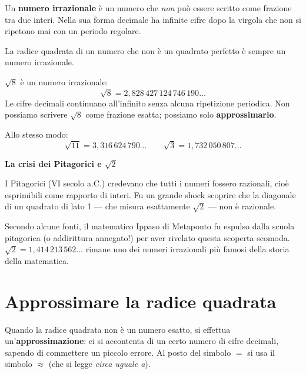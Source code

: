 \begin{definizione}
    Un \textbf{numero irrazionale} è un numero che \emph{non} può essere
    scritto come frazione tra due interi. Nella sua forma decimale ha
    infinite cifre dopo la virgola che non si ripetono mai con un periodo
    regolare.

    La radice quadrata di un numero che non è un quadrato perfetto è sempre
    un numero irrazionale.
\end{definizione}

\begin{esempio}
    \(\sqrt{8}\) è un numero irrazionale:
    \[
        \sqrt{8} = 2{,}828\,427\,124\,746\,190\ldots
    \]
    Le cifre decimali continuano all'infinito senza alcuna ripetizione periodica.
    Non possiamo scrivere \(\sqrt{8}\) come frazione esatta; possiamo solo
    \textbf{approssimarlo}.

    Allo stesso modo:
    \[
        \sqrt{11} = 3{,}316\,624\,790\ldots \qquad
        \sqrt{3}  = 1{,}732\,050\,807\ldots
    \]
\end{esempio}

\begin{sapevi}
    \textbf{La crisi dei Pitagorici e \(\sqrt{2}\)}

    I Pitagorici (VI secolo a.C.) credevano che tutti i numeri fossero
    razionali, cioè esprimibili come rapporto di interi. Fu un grande
    shock scoprire che la diagonale di un quadrato di lato 1 — che misura
    esattamente \(\sqrt{2}\) — non è razionale.

    Secondo alcune fonti, il matematico Ippaso di Metaponto fu espulso
    dalla scuola pitagorica (o addirittura annegato!) per aver rivelato
    questa scoperta scomoda. \(\sqrt{2} = 1{,}414\,213\,562\ldots\) rimane
    uno dei numeri irrazionali più famosi della storia della matematica.
\end{sapevi}

\section{Approssimare la radice quadrata}

Quando la radice quadrata non è un numero esatto, si effettua
un'\textbf{approssimazione}: ci si accontenta di un certo numero di
cifre decimali, sapendo di commettere un piccolo errore.
Al posto del simbolo \(=\) si usa il simbolo \(\approx\) (che si legge
\emph{circa uguale a}).

